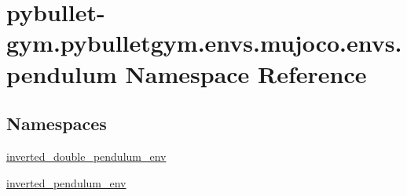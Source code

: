 \hypertarget{namespacepybullet-gym_1_1pybulletgym_1_1envs_1_1mujoco_1_1envs_1_1pendulum}{}\section{pybullet-\/gym.pybulletgym.\+envs.\+mujoco.\+envs.\+pendulum Namespace Reference}
\label{namespacepybullet-gym_1_1pybulletgym_1_1envs_1_1mujoco_1_1envs_1_1pendulum}
\subsection*{Namespaces}
\begin{DoxyCompactItemize}
\item 
 \hyperlink{namespacepybullet-gym_1_1pybulletgym_1_1envs_1_1mujoco_1_1envs_1_1pendulum_1_1inverted__double__pendulum__env}{inverted\+\_\+double\+\_\+pendulum\+\_\+env}
\item 
 \hyperlink{namespacepybullet-gym_1_1pybulletgym_1_1envs_1_1mujoco_1_1envs_1_1pendulum_1_1inverted__pendulum__env}{inverted\+\_\+pendulum\+\_\+env}
\end{DoxyCompactItemize}
